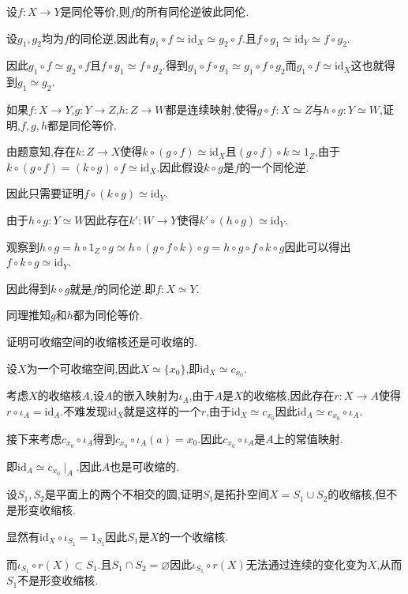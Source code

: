 \documentclass{article}
\begin{document}
\begin{exercise}
    设$f : X \to Y$是同伦等价,则$f$的所有同伦逆彼此同伦.
\end{exercise}
\begin{solution}
    设$g_1,g_2$均为$f$的同伦逆,因此有$g_1 \circ f \simeq \text{id}_X \simeq g_2 \circ f$.且$f \circ g_1 \simeq \text{id}_Y \simeq f \circ g_2$.


    因此$g_1 \circ f \simeq g_2 \circ f$且$f \circ g_1 \simeq f \circ g_2$.得到$g_1 \circ f \circ g_1 \simeq g_1\circ f \circ g_2$而$g_1 \circ f \simeq \text{id}_X$这也就得到$g_1 \simeq g_2$.
\end{solution}
\begin{exercise}
    如果$f:X\to Y$,$g : Y\to Z$,$h : Z\to W$都是连续映射,使得$g \circ f : X \simeq Z$与$h \circ g : Y \simeq W$,证明,$f,g,h$都是同伦等价.
\end{exercise}
\begin{solution}
    由题意知,存在$k : Z \to X$使得$k \circ (g \circ f) \simeq \text{id}_X$且$(g \circ f) \circ k \simeq 1_Z$,由于$k \circ (g \circ f) = (k\circ g)\circ f \simeq \text{id}_X$.因此假设$k \circ g$是$f$的一个同伦逆.
    
    
    因此只需要证明$f \circ (k \circ g) \simeq \text{id}_Y$.


    由于$h \circ g: Y \simeq W$因此存在$k' : W \to Y$使得$k' \circ (h \circ g) \simeq \text{id}_Y$.


    观察到$h \circ g = h \circ 1_Z \circ g \simeq h \circ (g \circ f \circ k) \circ g = h \circ g \circ f \circ k \circ g$因此可以得出$f \circ k \circ g \simeq \text{id}_Y$.


    因此得到$k \circ g$就是$f$的同伦逆.即$f: X\simeq Y$.


    同理推知$g$和$h$都为同伦等价.
\end{solution}
\begin{exercise}
    证明可收缩空间的收缩核还是可收缩的.
\end{exercise}
\begin{solution}
    设$X$为一个可收缩空间,因此$X \simeq \{x_0\}$,即$\text{id}_X\simeq c_{x_0}$.


    考虑$X$的收缩核$A$,设$A$的嵌入映射为$\iota_A$,由于$A$是$X$的收缩核,因此存在$r : X \to A$使得$r \circ \iota_A = \text{id}_A$.不难发现$\text{id}_X$就是这样的一个$r$,由于$\text{id}_X \simeq c_{x_0}$因此$\text{id}_A \simeq c_{x_0}\circ \iota_A$.


    接下来考虑$c_{x_0}\circ \iota_A$得到$c_{x_0} \circ \iota_A (a) = x_0$.因此$c_{x_0} \circ \iota_A$是$A$上的常值映射.


    即$\text{id}_A \simeq c_{x_0}\mid_A$.因此$A$也是可收缩的.
\end{solution}
\begin{exercise}
    设$S_1,S_2$是平面上的两个不相交的圆,证明$S_1$是拓扑空间$X = S_1 \cup S_2$的收缩核,但不是形变收缩核.
\end{exercise}
\begin{solution}
    显然有$\text{id}_X \circ \iota_{S_1} = 1_{S_1}$因此$S_1$是$X$的一个收缩核.


    而$\iota_{S_1}\circ r(X)\subset S_1$.且$S_1 \cap S_2 = \varnothing$因此$\iota_{S_1} \circ r(X)$无法通过连续的变化变为$X$,从而$S_1$不是形变收缩核.
\end{solution}
\newpage
\end{document}
